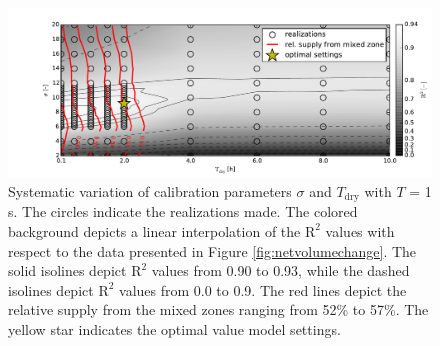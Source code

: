 
\begin{figure}
  \centering
  \includegraphics[width=\columnwidth]{../Figures/calibration}
  \caption{Systematic variation of calibration parameters $\sigma$ and
    $T_{\mathrm{dry}}$ with $T$ = 1 s. The circles indicate the
    realizations made. The colored background depicts a linear
    interpolation of the $\mathrm{R^2}$ values with respect to the
    data presented in Figure \ref{fig:netvolumechange}. The solid
    isolines depict $\mathrm{R}^2$ values from 0.90 to 0.93, while the
    dashed isolines depict $\mathrm{R}^2$ values from 0.0 to 0.9. The
    red lines depict the relative supply from the mixed zones ranging
    from 52\% to 57\%. The yellow star indicates the optimal value
    model settings.}
  \label{fig:calibration}
\end{figure}


